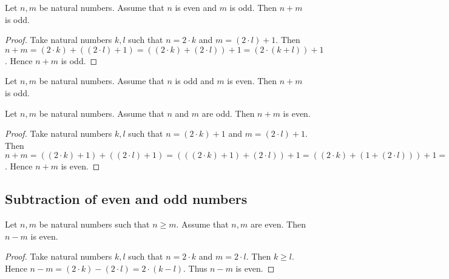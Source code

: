 \documentclass[10pt]{article}
\begin{document}
  \begin{forthel}
    \begin{proposition}[id=ARITHMETIC_15_1023655256985478,printid]
      Let $n, m$ be natural numbers.
      Assume that $n$ is even and $m$ is odd.
      Then $n + m$ is odd.
    \end{proposition}
    \begin{proof}
      Take natural numbers $k, l$ such that $n = 2 \cdot k$ and $m = (2 \cdot l) + 1$.
      Then $n + m
        = (2 \cdot k) + ((2 \cdot l) + 1)
        = ((2 \cdot k) + (2 \cdot l)) + 1
        = (2 \cdot (k + l)) + 1$.
      Hence $n + m$ is odd.
    \end{proof}
  \end{forthel}

  \begin{forthel}
    \begin{corollary}[id=ARITHMETIC_15_0125412589658745,printid]
      Let $n, m$ be natural numbers.
      Assume that $n$ is odd and $m$ is even.
      Then $n + m$ is odd.
    \end{corollary}
  \end{forthel}

  \begin{forthel}
    \begin{proposition}[id=ARITHMETIC_15_1023659854785412,printid]
      Let $n, m$ be natural numbers.
      Assume that $n$ and $m$ are odd.
      Then $n + m$ is even.
    \end{proposition}
    \begin{proof}
      Take natural numbers $k, l$ such that $n = (2 \cdot k) + 1$ and $m = (2 \cdot l) + 1$.
      Then $n + m
        = ((2 \cdot k) + 1) + ((2 \cdot l) + 1)
        = (((2 \cdot k) + 1) + (2 \cdot l)) + 1
        = ((2 \cdot k) + (1 + (2 \cdot l))) + 1
        = ((2 \cdot k) + ((2 \cdot l) + 1)) + 1
        = (((2 \cdot k) + (2 \cdot l)) + 1) + 1
        = ((2 \cdot k) + (2 \cdot l)) + (1 + 1)
        = ((2 \cdot k) + (2 \cdot l)) + 2
        = (2 \cdot (k + l)) + 2
        = 2 \cdot ((k + l) + 1)$.
        Hence $n + m$ is even.
    \end{proof}
  \end{forthel}


  \subsection{Subtraction of even and odd numbers}

  \begin{forthel}
    \begin{proposition}[id=ARITHMETIC_15_8748569852145203,printid]
      Let $n, m$ be natural numbers such that $n \geq m$.
      Assume that $n, m$ are even.
      Then $n - m$ is even.
    \end{proposition}
    \begin{proof}
      Take natural numbers $k, l$ such that $n = 2 \cdot k$ and $m = 2 \cdot l$.
      Then $k \geq l$.
      Hence $n - m
        = (2 \cdot k) - (2 \cdot l)
        = 2 \cdot (k - l)$.
      Thus $n - m$ is even.
    \end{proof}
  \end{forthel}
\end{document}
